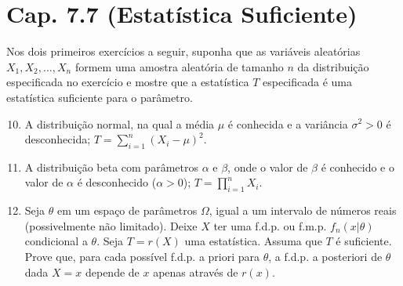 \documentclass[leqno, 12pt]{article}
\theoremstyle{definition}
\newcommand{\rs}{X_1, X_2, \ldots, X_n} %
\begin{document}
\section*{Cap. 7.7 (Estatística Suficiente)}

Nos dois primeiros exercícios a seguir, suponha que as variáveis aleatórias \(\rs\) formem uma amostra aleatória de tamanho \(n\) da distribuição especificada no exercício e mostre que a estatística \(T\) especificada é uma estatística suficiente para o parâmetro.

\begin{enumerate}
\setcounter{enumi}{9}


\item \textbf{\parencite[ex. 4, pág. 448]{DeGroot:2014}} A distribuição normal, na qual a média \(\mu\) é conhecida e a variância \(\sigma^2 > 0\) é desconhecida; \(T = \sum_{i=1}^{n}(X_i - \mu)^2\).


\item \textbf{\parencite[ex. 7, pág. 448]{DeGroot:2014}} A distribuição beta com parâmetros \(\alpha\) e \(\beta\), onde o valor de \(\beta\) é conhecido e o valor de \(\alpha\) é desconhecido (\(\alpha > 0\)); \(T = \prod_{i=1}^{n} X_i\).


\item \textbf{\parencite[ex. 16, pág. 448]{DeGroot:2014}} Seja \(\theta\) em um espaço de parâmetros \(\Omega\), igual a um intervalo de números reais (possivelmente não limitado). Deixe \(X\) ter uma f.d.p. ou f.m.p. \(f_n(x|\theta)\) condicional a \(\theta\). Seja \(T = r(X)\) uma estatística. Assuma que \(T\) é suficiente. Prove que, para cada possível f.d.p. a priori para \(\theta\), a f.d.p. a posteriori de \(\theta\) dada \(X = x\) depende de \(x\) apenas através de \(r(x)\).



\end{enumerate}
\end{document}
